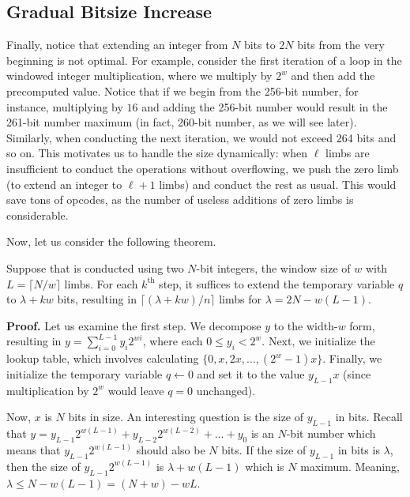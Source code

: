 \documentclass{iacrtrans}
\begin{document}
\subsection{Gradual Bitsize Increase}\label{section:size_increase}

Finally, notice that extending an integer from $N$ bits to $2N$ bits from the very beginning is not optimal. For example, consider the first iteration of a loop in the windowed integer multiplication, where we multiply by $2^w$ and then add the precomputed value. Notice that if we begin from the 256-bit number, for instance, multiplying by $16$ and adding the 256-bit number would result in the 261-bit number maximum (in fact, 260-bit number, as we will see later). Similarly, when conducting the next iteration, we would not exceed 264 bits and so on. This motivates us to handle the size dynamically: when $\ell$ limbs are insufficient to conduct the operations without overflowing, we push the zero limb (to extend an integer to $\ell+1$ limbs) and conduct the rest as usual. This would save tons of opcodes, as the number of useless additions of zero limbs is considerable. 

Now, let us consider the following theorem.

\begin{theorem}\label{theorem:gradual_increase}
    Suppose that  is conducted using two $N$-bit integers, the window size of $w$ with $L=\lceil N/w \rceil$ limbs. For each $k^{\text{th}}$ step, it suffices to extend the temporary variable $q$ to $\lambda+kw$ bits, resulting in $\lceil (\lambda+kw)/n \rceil$ limbs for $\lambda = 2N - w(L-1)$.
\end{theorem}

\textbf{Proof.} Let us examine the first step. We decompose $y$ to the width-$w$ form, resulting in $y = \sum_{i=0}^{L-1}y_i2^{wi}$, where each $0 \leq y_i < 2^w$. Next, we initialize the lookup table, which involves calculating $\{0,x,2x,\dots,(2^w-1)x\}$. Finally, we initialize the temporary variable $q \gets 0$ and set it to the value $y_{L-1}x$ (since multiplication by $2^w$ would leave $q=0$ unchanged). 

Now, $x$ is $N$ bits in size. An interesting question is the size of $y_{L-1}$ in bits. Recall that $y=y_{L-1}2^{w(L-1)}+y_{L-2}2^{w(L-2)}+\dots+y_0$ is an $N$-bit number which means that $y_{L-1}2^{w(L-1)}$ should also be $N$ bits. If the size of $y_{L-1}$ in bits is $\lambda$, then the size of $y_{L-1}2^{w(L-1)}$ is $\lambda+w(L-1)$ which is $N$ maximum. Meaning, $\lambda \leq N - w(L-1) = (N+w) - wL$. 
\end{document}
